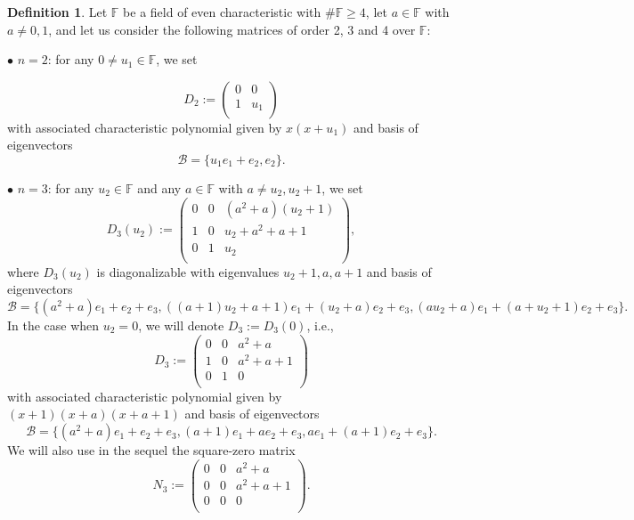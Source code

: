 \documentclass{amsart}
\def\FF{\mathbb{F}}
\theoremstyle{definition}
\newtheorem{definition}[theorem]{Definition}
\theoremstyle{remark}
\numberwithin{equation}{section}
\begin{document}
\begin{definition}\label{notation} Let $\mathbb{F}$ be a field of even characteristic with $\#\mathbb{F}\ge 4$, let $a\in \mathbb{F}$ with $a\ne 0,1$, and let us consider the following matrices of order 2, 3 and 4 over $\FF$:

\medskip

\noindent $\bullet$ $n=2$: for any $0\ne u_1\in \FF$, we set

$$D_{2}:=\left(
    \begin{array}{cc}
      0 & 0 \\
      1 & u_1 \\
    \end{array}
  \right)$$
with associated characteristic polynomial given by $x(x+u_1)$ and basis of eigenvectors $$\mathcal{B}=\{u_1 e_1+e_2, e_2\}.$$

\medskip

\noindent $\bullet$ $n=3$: for any $u_2\in \FF$ and any $a\in \FF$ with $a\ne u_2, u_2+1$, we set
$$
D_{3}(u_2):=
\left(
  \begin{array}{ccc}
     0 & 0 & (a^2+a)(u_2+1) \\
     1 & 0 & u_2+a^2+a+1 \\
     0 & 1 & u_2 \\
  \end{array}
\right)
         ,$$
where $D_3(u_2)$ is diagonalizable with eigenvalues $u_2+1, a, a+1$ and basis of eigenvectors
$$\mathcal{B}=\{ (a^2+a)e_1+e_2+e_3, ((a+1)u_2+a+1)e_1+(u_2+a)e_2+e_3, (au_2+a)e_1+(a+u_2+1)e_2+e_3
\}.$$
In the case when $u_2=0$, we will denote $D_3:=D_3(0)$, i.e.,
$$D_{3}:=
\left(
  \begin{array}{ccc}
     0 & 0 & a^2+a \\
     1 & 0 & a^2+a+1 \\
     0 & 1 & 0 \\
  \end{array}
\right)
$$
with associated characteristic polynomial given by $(x+1)(x+a)(x+a+1)$ and basis of eigenvectors
$$
\mathcal{B}=\{(a^2+a)e_1+e_2+e_3, (a+1)e_1+ae_2+e_3, ae_1+(a+1)e_2+e_3\}.
$$
We will also use in the sequel the square-zero matrix
$$
N_3:=\left(
           \begin{array}{ccc}
             0 & 0 & a^2+a \\
             0 & 0 & a^2+a+1 \\
             0 & 0 & 0 \\
           \end{array}
         \right).
$$


\end{definition}
\end{document}
